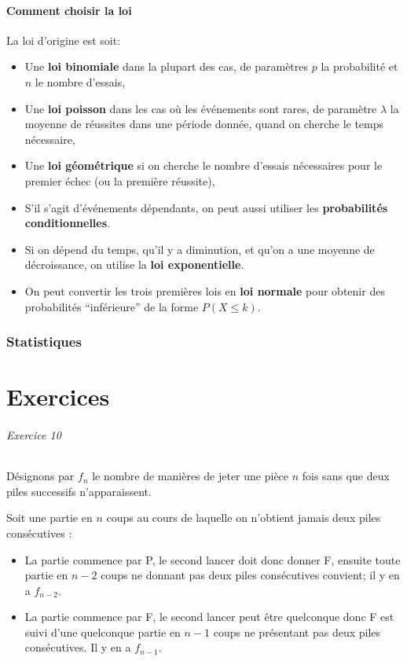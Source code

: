 \documentclass[10pt,a4paper,french]{article}
\begin{document}
\subsection{Comment choisir la loi}

La loi d'origine est soit:

\begin{itemize}
\item Une \textbf{loi binomiale} dans la plupart des cas, de paramètres $p$ la probabilité et $n$ le nombre d'essais,
\item Une \textbf{loi poisson} dans les cas où les événements sont rares, de paramètre $\lambda$ la moyenne de réussites dans une période donnée, quand on cherche le temps nécessaire,
\item Une \textbf{loi géométrique} si on cherche le nombre d'essais nécessaires pour le premier échec (ou la première réussite),
\item S'il s'agit d'événements dépendants, on peut aussi utiliser les \textbf{probabilités conditionnelles}.
\item Si on dépend du temps, qu'il y a diminution, et qu'on a une moyenne de décroissance, on utilise la \textbf{loi exponentielle}.
\item On peut convertir les trois premières lois en \textbf{loi normale} pour obtenir des probabilités ``inférieure'' de la forme $P(X \leq k)$.
\end{itemize}

\section{Statistiques}




\part{Exercices}

\paragraph{Exercice 10}
Désignons par $f_n$ le nombre de manières de jeter une pièce $n$ fois sans que deux piles successifs n'apparaissent.

Soit une partie en $n$ coups au cours de laquelle on n'obtient jamais deux piles consécutives :
\begin{itemize}
\item La partie commence par P, le second lancer doit donc donner F, ensuite toute partie en $n-2$ coups ne donnant pas deux piles consécutives convient; il y en a $f_{n-2}$.
\item La partie commence par F, le second lancer peut être quelconque donc F est suivi d'une quelconque partie en $n-1$ coups ne présentant pas deux piles consécutives. Il y en a $f_{n-1}$.
\end{itemize}
\end{document}
